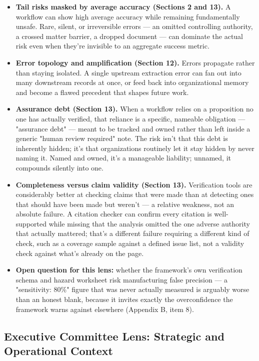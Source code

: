 \begin{itemize}
\item \textbf{Tail risks masked by average accuracy (Sections 2 and 13).} A workflow can show high average accuracy while remaining fundamentally unsafe. Rare, silent, or irreversible errors --- an omitted controlling authority, a crossed matter barrier, a dropped document --- can dominate the actual risk even when they're invisible to an aggregate success metric.
\item \textbf{Error topology and amplification (Section 12).} Errors propagate rather than staying isolated. A single upstream extraction error can fan out into many downstream records at once, or feed back into organizational memory and become a flawed precedent that shapes future work.
\item \textbf{Assurance debt (Section 13).} When a workflow relies on a proposition no one has actually verified, that reliance is a specific, nameable obligation --- "assurance debt" --- meant to be tracked and owned rather than left inside a generic "human review required" note. The risk isn't that this debt is inherently hidden; it's that organizations routinely let it stay hidden by never naming it. Named and owned, it's a manageable liability; unnamed, it compounds silently into one.
\item \textbf{Completeness versus claim validity (Section 13).} Verification tools are considerably better at checking claims that were made than at detecting ones that should have been made but weren't --- a relative weakness, not an absolute failure. A citation checker can confirm every citation is well-supported while missing that the analysis omitted the one adverse authority that actually mattered; that's a different failure requiring a different kind of check, such as a coverage sample against a defined issue list, not a validity check against what's already on the page.
\item \textbf{Open question for this lens:} whether the framework's own verification schema and hazard worksheet risk manufacturing false precision --- a "sensitivity: 80\%" figure that was never actually measured is arguably worse than an honest blank, because it invites exactly the overconfidence the framework warns against elsewhere (Appendix B, item 8).
\end{itemize}

\subsection*{Executive Committee Lens: Strategic and Operational Context}

